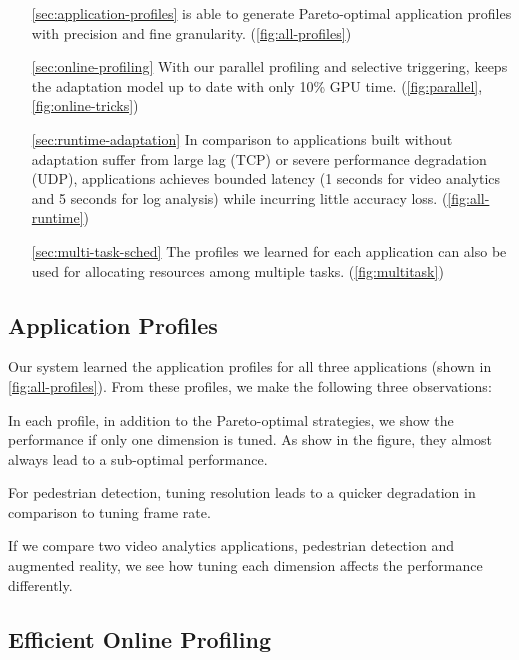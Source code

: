 \begin{itemize}
\item[\autoref{sec:application-profiles}] \sysname{} is able to generate
  Pareto-optimal application profiles with precision and fine
  granularity. (\autoref{fig:all-profiles})
\item[\autoref{sec:online-profiling}] With our parallel profiling and selective
  triggering, \sysname{} keeps the adaptation model up to date with only 10\%
  GPU time. (\autoref{fig:parallel}, \autoref{fig:online-tricks})
\item[\autoref{sec:runtime-adaptation}] In comparison to applications built
  without adaptation suffer from large lag (TCP) or severe performance
  degradation (UDP), \sysname{} applications achieves bounded latency (1 seconds
  for video analytics and 5 seconds for log analysis) while incurring little
  accuracy loss. (\autoref{fig:all-runtime})
\item[\autoref{sec:multi-task-sched}] The profiles we learned for each
  application can also be used for allocating resources among multiple
  tasks. (\autoref{fig:multitask})
\end{itemize}

\subsection{Application Profiles}
\label{sec:application-profiles}

Our system learned the application profiles for all three applications (shown in
\autoref{fig:all-profiles}). From these profiles, we make the following three
observations:

 In each profile,
in addition to the Pareto-optimal strategies, we show the performance if only
one dimension is tuned. As show in the figure, they almost always lead to a
sub-optimal performance.

For pedestrian detection, tuning resolution leads to a quicker degradation in
comparison to tuning frame rate.

If we compare two video analytics applications, pedestrian detection and
augmented reality, we see how tuning each dimension affects the performance
differently.

\subsection{Efficient Online Profiling}
\label{sec:online-profiling}


